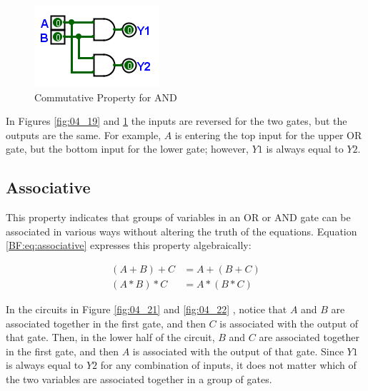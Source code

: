 
\begin{figure}[H]
	\centering
	\includegraphics[width=\maxwidth{.95\linewidth}]{gfx/04_20}
	\caption{Commutative Property for AND}
	\label{fig:04_20}
\end{figure}

In Figures \ref{fig:04_19} and \ref{fig:04_20} the inputs are reversed for the two gates, but the outputs are the same. For example, $ A $ is entering the top input for the upper \textsf{OR} gate, but the bottom input for the lower gate; however, $ Y1 $ is always equal to $ Y2 $.

\subsection{Associative}
\label{BF:subsec:associative_property}


This property indicates that groups of variables in an \textsf{OR} or \textsf{AND} gate can be associated in various ways without altering the truth of the equations. Equation \ref{BF:eq:associative} expresses this property algebraically: 

\begin{align}
  \label{BF:eq:associative}
  ( A + B ) + C &= A + ( B + C ) \\
  \nonumber
  ( A * B ) * C &= A * ( B * C )
\end{align}


In the circuits in Figure \ref{fig:04_21} and \ref{fig:04_22} , notice that $ A $ and $ B $ are associated together in the first gate, and then $ C $ is associated with the output of that gate. Then, in the lower half of the circuit, $ B $ and $ C $ are associated together in the first gate, and then $ A $ is associated with the output of that gate. Since $ Y1 $ is always equal to $ Y2 $ for any combination of inputs, it does not matter which of the two variables are associated together in a group of gates.  

